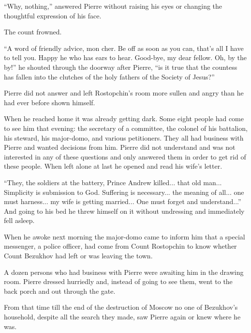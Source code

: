 ``Why, nothing,'' answered Pierre without raising his eyes or
changing the thoughtful expression of his face.

The count frowned.

``A word of friendly advice, mon cher. Be off as soon as you can,
that's all I have to tell you. Happy he who has ears to
hear. Good-bye, my dear fellow. Oh, by the by!'' he shouted
through the doorway after Pierre, ``is it true that the countess
has fallen into the clutches of the holy fathers of the Society
of Jesus?''

Pierre did not answer and left Rostopchin's room more sullen and
angry than he had ever before shown himself.

When he reached home it was already getting dark. Some eight
people had come to see him that evening: the secretary of a
committee, the colonel of his battalion, his steward, his
major-domo, and various petitioners.  They all had business with
Pierre and wanted decisions from him. Pierre did not understand
and was not interested in any of these questions and only
answered them in order to get rid of these people. When left
alone at last he opened and read his wife's letter.

``They, the soldiers at the battery, Prince Andrew killed... that
old man... Simplicity is submission to God. Suffering is
necessary... the meaning of all... one must harness... my wife is
getting married... One must forget and understand...'' And going
to his bed he threw himself on it without undressing and
immediately fell asleep.

When he awoke next morning the major-domo came to inform him that
a special messenger, a police officer, had come from Count
Rostopchin to know whether Count Bezukhov had left or was leaving
the town.

A dozen persons who had business with Pierre were awaiting him in
the drawing room. Pierre dressed hurriedly and, instead of going
to see them, went to the back porch and out through the gate.

From that time till the end of the destruction of Moscow no one
of Bezukhov's household, despite all the search they made, saw
Pierre again or knew where he was.


